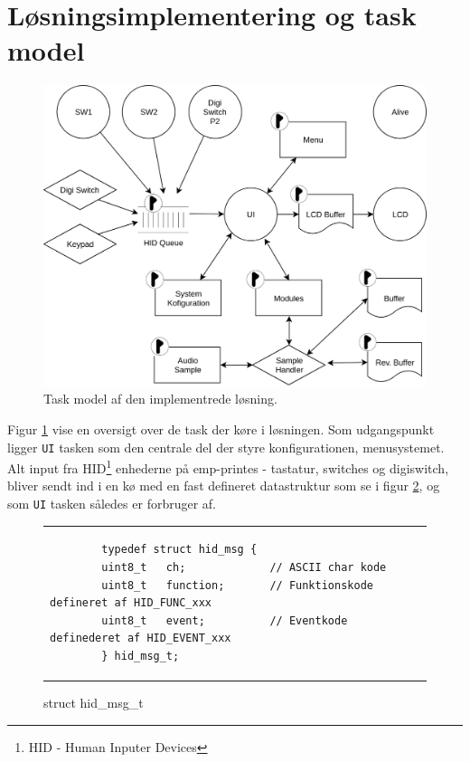 \section{Løsningsimplementering og task model}
\begin{figure}[h]
	\centering
	\includegraphics[width=.9\linewidth]{billeder/taskmodel.png}
	\caption{Task model af den implementrede løsning.}
	\label{fig:taskmodel}
\end{figure}
Figur \ref{fig:taskmodel} vise en oversigt over de task der køre i løsningen.
Som udgangspunkt ligger \texttt{UI} tasken som den centrale del der styre konfigurationen, menusystemet.
Alt input fra HID\footnote{HID - Human Inputer Devices} enhederne på emp-printes - tastatur, switches og digiswitch, bliver sendt ind i en kø med en fast defineret datastruktur som se i figur \ref{fig:hid_msg}, og som \texttt{UI} tasken således er forbruger af.
\begin{figure}[h!]
\begin{tabular}{l}
	\begin{lstlisting}
		typedef struct hid_msg {
		uint8_t   ch;             // ASCII char kode
		uint8_t   function;       // Funktionskode defineret af HID_FUNC_xxx
		uint8_t   event;          // Eventkode definederet af HID_EVENT_xxx
		} hid_msg_t;
	\end{lstlisting}
	
\end{tabular}
\label{fig:hid_msg}
\caption{struct hid\_msg\_t}
\end{figure}

